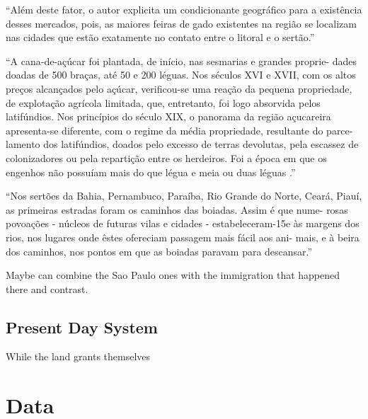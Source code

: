 \documentclass{article}
\begin{document}
``Além deste fator, o autor explicita um condicionante geográfico para a existência desses mercados, pois, as maiores feiras de gado existentes na região se localizam nas cidades que estão exatamente no contato entre o litoral e o sertão.'' \parencite{Galdino_Dantas2008-pw}

``A  cana-de-açúcar foi  plantada,  de  início,  nas sesmarias  e  grandes  proprie- dades  doadas de  500  braças,  até  50  e  200  léguas.  Nos  séculos XVI  e  XVII,  com  os  altos  preços  alcançados  pelo  açúcar,  verificou-se  uma  reação  da  pequena  propriedade,  de  explotação agrícola  limitada,  que,  entretanto,  foi  logo  absorvida  pelos latifúndios. Nos  princípios  do  século  XIX, o panorama da região  açucareira  apresenta-se diferente,  com o  regime da média propriedade, resultante  do parce- lamento  dos  latifúndios,  doados  pelo  excesso  de  terras  devolutas,  pela  escassez  de  colonizadores  ou  pela  repartição  entre  os  herdeiros.  Foi  a  época  em  que  os  engenhos  não  possuíam  mais  do  que  légua  e  meia  ou  duas  léguas .''
\parencite[p.~118]{De_Geografia1970-nk}


``Nos  sertões  da  Bahia,  Pernambuco,  Paraíba,  Rio  Grande  do  Norte,  Ceará,  Piauí, as primeiras estradas foram os  caminhos das boiadas.  Assim  é  que nume- rosas  povoações  - núcleos  de  futuras  vilas  e  cidades  - estabeleceram-15e  às  margens dos rios,  nos lugares onde  êstes ofereciam passagem mais fácil  aos ani- mais,  e  à  beira  dos  caminhos,  nos  pontos  em  que  as  boiadas  paravam  para  descansar.''
\parencite[p.~164]{De_Geografia1970-nk}

\parencite{Panini1990-rj}

Maybe can combine the Sao Paulo ones with the immigration that happened there and contrast.

\subsection{Present Day System}

While the land grants themselves 

\section{Data}
\end{document}
